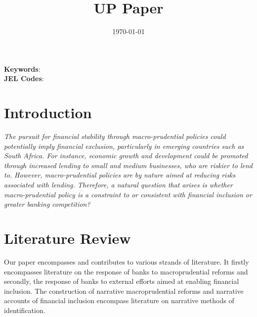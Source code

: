 \documentclass[
  letterpaper,
  DIV=11,
  numbers=noendperiod]{scrartcl}
\author{}
\date{}
\begin{document}
\title{UP Paper}



\date{\today}
\maketitle

\begin{abstract}


\end{abstract}

\noindent\textbf{Keywords}:    \\
\textbf{JEL Codes}: 
\newpage

\ifdefined\Shaded\renewenvironment{Shaded}{\begin{tcolorbox}[boxrule=0pt, interior hidden, frame hidden, enhanced, borderline west={3pt}{0pt}{shadecolor}, sharp corners, breakable]}{\end{tcolorbox}}\fi

\hypertarget{introduction}{%
\section{Introduction}\label{introduction}}

\textit{The pursuit for financial stability through macro-prudential policies could potentially imply financial exclusion, particularly in emerging countries such as South Africa. For instance, economic growth and development could be promoted through increased lending to small and medium businesses, who are riskier to lend to. However, macro-prudential policies are by nature aimed at reducing risks associated with lending. Therefore, a natural question that arises is whether macro-prudential policy is a constraint to or consistent with financial inclusion or greater banking competition?}

\hypertarget{literature-review}{%
\section{Literature Review}\label{literature-review}}

Our paper encompasses and contributes to various strands of literature.
It firstly encompasses literature on the response of banks to
macroprudential reforms and secondly, the response of banks to external
efforts aimed at enabling financial inclusion. The construction of
narrative macroprudential reforms and narrative accounts of financial
inclusion encompass literature on narrative methods of identification.
\end{document}
